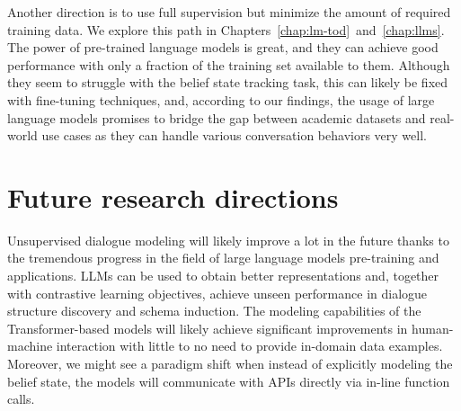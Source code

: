 Another direction is to use full supervision but minimize the amount of required training data.
We explore this path in Chapters~\ref{chap:lm-tod}~and~\ref{chap:llms}.
The power of pre-trained language models is great, and they can achieve good performance with only a fraction of the training set available to them.
Although they seem to struggle with the belief state tracking task, this can likely be fixed with fine-tuning techniques, and, according to our findings, the usage of large language models promises to bridge the gap between academic datasets and real-world use cases as they can handle various conversation behaviors very well. 

\section{Future research directions}
Unsupervised dialogue modeling will likely improve a lot in the future thanks to the tremendous progress in the field of large language models pre-training and applications.
LLMs can be used to obtain better representations and, together with contrastive learning objectives, achieve unseen performance in dialogue structure discovery and schema induction.
The modeling capabilities of the Transformer-based models will likely achieve significant improvements in human-machine interaction with little to no need to provide in-domain data examples.
Moreover, we might see a paradigm shift when instead of explicitly modeling the belief state, the models will communicate with APIs directly via in-line function calls.